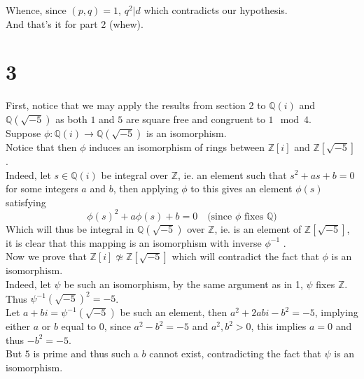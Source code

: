 \documentclass[11pt, a4paper]{article}
\begin{document}
Whence, since $( p,q) =1$, $q^{2} |d$ which contradicts our hypothesis.\\

And that's it for part 2 (whew).

\section*{3}
First, notice that we may apply the results from section 2 to $ \mathbb{Q}( i) $ and $ \mathbb{Q}( \sqrt{-5} ) $ as both $1$ and $5$ are square free and congruent to $1\mod 4$.\\
Suppose $\phi: \mathbb{Q}( i) \to \mathbb{Q}( \sqrt{-5} ) $ is an isomorphism.\\
Notice that then $\phi$ induces an isomorphism of rings between $ \mathbb{Z}[i]$ and $ \mathbb{Z}[\sqrt{-5} ]$.\\
Indeed, let $ s\in \mathbb{Q}( i) $ be integral over $ \mathbb{Z}$, ie. an element such that $ s^{2} + as +b =0$ for some integers $a$ and $b$, then applying $\phi$ to this gives an element $\phi( s) $ satisfying
\[ 
\phi( s) ^{2} + a \phi( s) +b =0 \quad\text{(since $\phi$ fixes $\mathbb{Q}$)} 
\]
Which will thus be integral in $ \mathbb{Q}(  \sqrt{-5} ) $ over $\mathbb{Z}$, ie. is an element of $ \mathbb{Z}[\sqrt{-5} ]$, it is clear that this mapping is an isomorphism with inverse $\phi^{-1}$ .\\
Now we prove that $ \mathbb{Z}[i] \not\simeq \mathbb{Z}[ \sqrt{-5} ]$ which will contradict the fact that $\phi$ is an isomorphism.\\

Indeed, let $\psi $ be such an isomorphism, by the same argument as in 1, $\psi$ fixes $\mathbb{Z}$.\\
Thus $\psi^{-1}(  \sqrt{-5} )^{2}= -5$.\\
Let $a+bi= \psi^{-1}(  \sqrt{-5} ) $ be such an element, then $a^{2}+2abi -b^{2} = -5$, implying either $ a$ or $b$ equal to $0$, since $a^{2}-b^{2} = -5$ and $ a^{2}, b^{2}>0$, this implies $a=0$ and thus $-b^{2} = -5$.\\
But $5$ is prime and thus such a $b$ cannot exist, contradicting the fact that $\psi$ is an isomorphism.





















		
\end{document}
